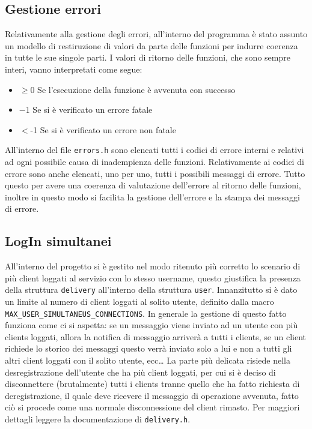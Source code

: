 \documentclass[a4paper,12pt]{report}
\begin{document}
\subsection*{Gestione errori}
Relativamente alla gestione degli errori, all'interno del programma è stato assunto un modello di restiruzione di valori da parte delle funzioni per indurre coerenza in tutte le sue singole parti.
I valori di ritorno delle funzioni, che sono sempre interi, vanno interpretati come segue:
\begin{itemize}
\item $\geq$0 Se l'esecuzione della funzione è avvenuta con successo
\item $-1$ Se si è verificato un errore fatale
\item $<$-1 Se si è verificato un errore non fatale
\end{itemize}
All'interno del file \texttt{errors.h} sono elencati tutti i codici di errore interni e relativi ad ogni possibile causa di inadempienza delle funzioni. Relativamente ai codici di errore sono anche elencati, uno per uno, tutti i possibili messaggi di errore. Tutto questo per avere una coerenza di valutazione dell'errore al ritorno delle funzioni, inoltre in questo modo si facilita la gestione dell'errore e la stampa dei messaggi di errore.

\subsection*{LogIn simultanei}
All'interno del progetto si è gestito nel modo ritenuto più corretto lo scenario di più client loggati al servizio con lo stesso username, questo giustifica la presenza della struttura \texttt{delivery} all'interno della struttura \texttt{user}. Innanzitutto si è dato un limite al numero di client loggati al solito utente, definito dalla macro \texttt{MAX\_USER\_SIMULTANEUS\_CONNECTIONS}. In generale la gestione di questo fatto funziona come ci si aspetta: se un messaggio viene inviato ad un utente con più clients loggati, allora la notifica di messaggio arriverà a tutti i clients, se un client richiede lo storico dei messaggi questo verrà inviato solo a lui e non a tutti gli altri client loggati con il solito utente, ecc\ldots
La parte più delicata risiede nella desregistrazione dell'utente che ha più client loggati, per cui si è deciso di disconnettere (brutalmente) tutti i clients tranne quello che ha fatto richiesta di deregistrazione, il quale deve ricevere il messaggio di operazione avvenuta, fatto ciò si procede come una normale disconnessione del client rimasto.
Per maggiori dettagli leggere la documentazione di \texttt{delivery.h}.
\end{document}
